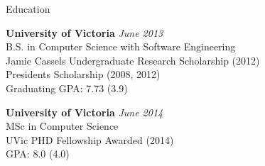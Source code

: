 \documentclass{resume} %
\begin{document}

\begin{rSection}{Education}

{\bf University of Victoria} \hfill {\em June 2013} \\
B.S. in Computer Science with Software Engineering \\
Jamie Cassels Undergraduate Research Scholarship (2012) \\
Presidents Scholarship (2008, 2012) \\
Graduating GPA: 7.73 (3.9)

{\bf University of Victoria} \hfill {\em June 2014} \\
MSc in Computer Science\\
UVic PHD Fellowship Awarded (2014)\\
GPA: 8.0 (4.0)

\end{rSection}

\end{document}

